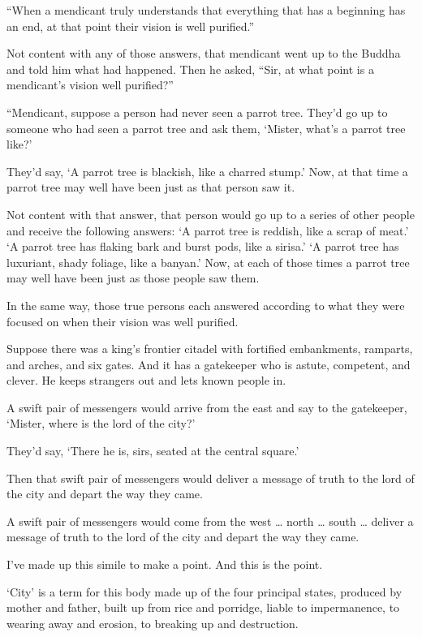 \documentclass[12pt,openany]{book}%
\begin{document}
“When a mendicant truly understands that everything that has a beginning has an end, at that point their vision is well purified.” 

Not content with any of those answers, that mendicant went up to the Buddha and told him what had happened. Then he asked, “Sir, at what point is a mendicant’s vision well purified?” 

“Mendicant, suppose a person had never seen a parrot tree. They’d go up to someone who had seen a parrot tree and ask them, ‘Mister, what’s a parrot tree like?’ 

They’d say, ‘A parrot tree is blackish, like a charred stump.’ Now, at that time a parrot tree may well have been just as that person saw it. 

Not content with that answer, that person would go up to a series of other people and receive the following answers: ‘A parrot tree is reddish, like a scrap of meat.’ ‘A parrot tree has flaking bark and burst pods, like a sirisa.’ ‘A parrot tree has luxuriant, shady foliage, like a banyan.’ Now, at each of those times a parrot tree may well have been just as those people saw them. 

In the same way, those true persons each answered according to what they were focused on when their vision was well purified. 

Suppose there was a king’s frontier citadel with fortified embankments, ramparts, and arches, and six gates. And it has a gatekeeper who is astute, competent, and clever. He keeps strangers out and lets known people in. 

A swift pair of messengers would arrive from the east and say to the gatekeeper, ‘Mister, where is the lord of the city?’ 

They’d say, ‘There he is, sirs, seated at the central square.’ 

Then that swift pair of messengers would deliver a message of truth to the lord of the city and depart the way they came. 

A swift pair of messengers would come from the west … north … south … deliver a message of truth to the lord of the city and depart the way they came. 

I’ve made up this simile to make a point. And this is the point. 

‘City’ is a term for this body made up of the four principal states, produced by mother and father, built up from rice and porridge, liable to impermanence, to wearing away and erosion, to breaking up and destruction. 
\end{document}
